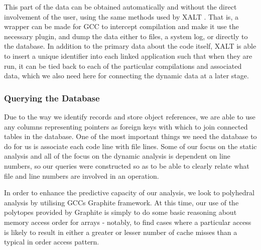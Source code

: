 This part of the data can be obtained automatically and without the direct involvement of the user, using the same methods used by XALT \cite{7081224}.
That is, a wrapper can be made for \ac{GCC} to intercept compilation and make it use the necessary plugin, and dump the data either to files, a system log, or directly to the database.
In addition to the primary data about the code itself, XALT is able to insert a unique identifier into each linked application such that when they are run, it can be tied back to each of the particular compilations and associated data, which we also need here for connecting the dynamic data at a later stage.
\subsubsection{Querying the Database}
Due to the way we identify records and store object references, we are able to use any columns representing pointers as foreign keys with which to join connected tables in the database.
One of the most important things we need the database to do for us is associate each code line with file lines.
Some of our focus on the static analysis and all of the focus on the dynamic analysis is dependent on line numbers, so our queries were constructed so as to be able to clearly relate what file and line numbers are involved in an operation.

In order to enhance the predictive capacity of our analysis, we look to polyhedral analysis by utilising \acsp{GCC} Graphite framework\cite{trifunovic:inria-00551516}.
At this time, our use of the polytopes provided by Graphite is simply to do some basic reasoning about memory access order for arrays - notably, to find cases where a particular access is likely to result in either a greater or lesser number of cache misses than a typical in order access pattern.

